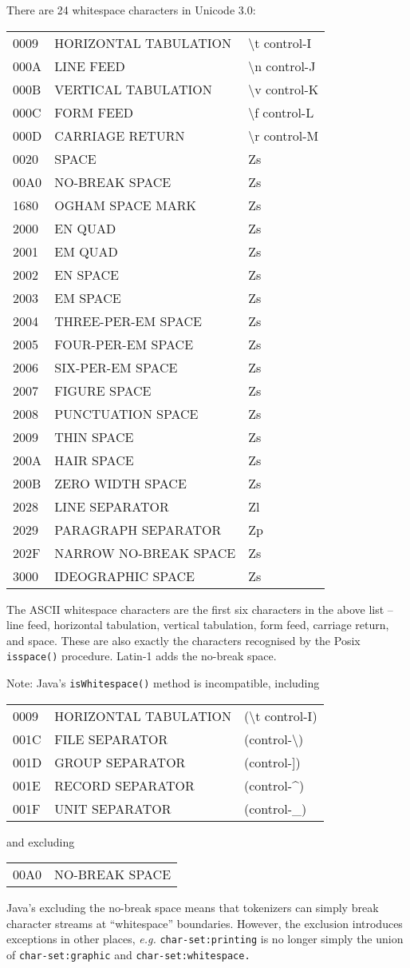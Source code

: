 There are 24 whitespace characters in Unicode 3.0:

\begin{tabular}{lll}
0009 & HORIZONTAL TABULATION & \textbackslash{}t
control-I\tabularnewline
000A & LINE FEED & \textbackslash{}n control-J\tabularnewline
000B & VERTICAL TABULATION & \textbackslash{}v control-K\tabularnewline
000C & FORM FEED & \textbackslash{}f control-L\tabularnewline
000D & CARRIAGE RETURN & \textbackslash{}r control-M\tabularnewline
0020 & SPACE & Zs\tabularnewline
00A0 & NO-BREAK SPACE & Zs\tabularnewline
1680 & OGHAM SPACE MARK & Zs\tabularnewline
2000 & EN QUAD & Zs\tabularnewline
2001 & EM QUAD & Zs\tabularnewline
2002 & EN SPACE & Zs\tabularnewline
2003 & EM SPACE & Zs\tabularnewline
2004 & THREE-PER-EM SPACE & Zs\tabularnewline
2005 & FOUR-PER-EM SPACE & Zs\tabularnewline
2006 & SIX-PER-EM SPACE & Zs\tabularnewline
2007 & FIGURE SPACE & Zs\tabularnewline
2008 & PUNCTUATION SPACE & Zs\tabularnewline
2009 & THIN SPACE & Zs\tabularnewline
200A & HAIR SPACE & Zs\tabularnewline
200B & ZERO WIDTH SPACE & Zs\tabularnewline
2028 & LINE SEPARATOR & Zl\tabularnewline
2029 & PARAGRAPH SEPARATOR & Zp\tabularnewline
202F & NARROW NO-BREAK SPACE & Zs\tabularnewline
3000 & IDEOGRAPHIC SPACE & Zs\tabularnewline
\end{tabular}

The ASCII whitespace characters are the first six characters in the
above list -- line feed, horizontal tabulation, vertical tabulation,
form feed, carriage return, and space. These are also exactly the
characters recognised by the Posix \texttt{isspace()} procedure. Latin-1
adds the no-break space.

Note: Java's \texttt{isWhitespace()} method is incompatible, including

\begin{tabular}{lll}
0009 & HORIZONTAL TABULATION & (\textbackslash{}t
control-I)\tabularnewline
001C & FILE SEPARATOR & (control-\textbackslash{})\tabularnewline
001D & GROUP SEPARATOR & (control-{]})\tabularnewline
001E & RECORD SEPARATOR & (control-\^{})\tabularnewline
001F & UNIT SEPARATOR & (control-\_)\tabularnewline
\end{tabular}

and excluding

\begin{tabular}{ll}
00A0 & NO-BREAK SPACE\tabularnewline
\end{tabular}

Java's excluding the no-break space means that tokenizers can simply
break character streams at ``whitespace'' boundaries. However, the
exclusion introduces exceptions in other places, \emph{e.g.}
\texttt{char-set:printing} is no longer simply the union of
\texttt{char-set:graphic} and \texttt{char-set:whitespace.}

